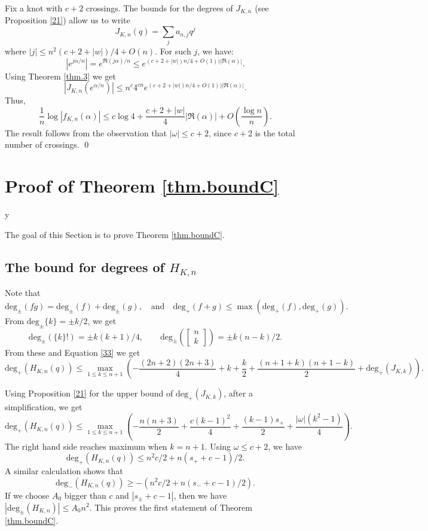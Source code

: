 \documentclass{amsart}
\theoremstyle{definition}
\def\printname#1{
    \if\draft y
        \smash{\makebox[0pt]{\hspace{-0.5in}
            \raisebox{8pt}{\tt\tiny #1}}}
    \fi
}
\newcommand{\qbinom}[2]{\text{$\left[\begin{array}{c}#1\\ #2\end{array}
\right]$}}
\def\lbl#1{\label{#1}\printname{#1}}
\def\a{\alpha}
\def\w{\omega}
\def\w{\omega}
\def\maxdeg{\mathrm{deg}_+}
\def\mindeg{\mathrm{deg}_-}
\def\deg{\mathrm{deg}}
\begin{document}

Fix a knot with $c+2$ crossings. The bounds for the degrees of
$J_{K,n}$ (see Proposition \ref{21}) allow us to write
$$
J_{K,n}(q)=\sum_{j} a_{n,j} q^j
$$
where $ |j|\leq  n^2 (c+2+|w|)/4 + O(n)$. For such $j$, we have:
$$
|e^{j\a/n}|=e^{\Re(j\a)/n} \leq e^{ (c+2+|w|)n/4 + O(1))|\Re(\a)|}.
$$
Using Theorem \ref{thm.3} we get
$$
|J_{K,n}(e^{\a/n})| \leq  n^c 4^{cn} e^{ (c+2+|w|)n/4 +
O(1))|\Re(\a)|}.
$$
Thus,
$$
\frac{1}{n} \log|f_{K,n}(\a)| \leq c\log4 + \frac{c+2+|w|}{4}
|\Re(\a)| + O\left(\frac{\log n}{n} \right).
$$
The result follows from the observation that $|\w| \le c+2$, since
$c+2$ is the total number of crossings.
\qed





\section{Proof of Theorem \ref{thm.boundC}}
\lbl{sec.boundscyclotomic}


The goal of this Section is to prove  Theorem \ref{thm.boundC}.

\subsection{The bound for degrees of $H_{K,n}$}
Note that
$$
\deg_\pm (fg) = \deg_\pm(f) + \deg_\pm(g),
\quad  \text{and} \quad \maxdeg(f+g) \le \max(\maxdeg(f), \maxdeg(g)).
$$
From $\deg_\pm \{k\} = \pm k/2$, we get
$$
\deg_\pm  (\{k\}!) = \pm k(k+1)/4,
\qquad \deg_\pm  (\qbinom{n}{k}) = \pm k(n-k)/2.
$$
From these and Equation \eqref{33} we get
$$
\maxdeg(H_{K,n}(q)) \le \max_{1\le k \le n+1 }
\left(  -\frac{(2n+2)(2n+3)}{4} + k +
\frac{k}{2}+ \frac{(n+1+k)(n+1-k)}{2} + \maxdeg (J_{K,k}) \right).
$$

Using Proposition \ref{21} for the upper bound of $\maxdeg
(J_{K,k})$, after a simplification, we get
$$
\maxdeg(H_{K,n}(q)) \le \max_{1\le k \le n+1 }
\left(  -\frac{n(n+3)}{2} + \frac{c (k-1)^2}{4} +
\frac{(k-1)s_+}{2} + \frac{|\w|(k^2-1)}{4}\right).
$$
The right hand side reaches maximum when $k=n+1$. Using $\w \le
c+2$,  we have
$$
\maxdeg(H_{K,n}(q)) \le n^2c/2 + n(s_+ +c-1)/2.
$$
A similar calculation shows that
$$
\mindeg(H_{K,n}(q)) \ge -( n^2c/2 + n(s_- +c-1)/2).
$$
If we choose $A_0$ bigger than  $c$ and $|s_\pm +c -1|$, then we
have $|\deg_\pm (H_{K,n}) |\le A_0 n^2$. This proves the first
statement of Theorem \ref{thm.boundC}.
\end{document}
